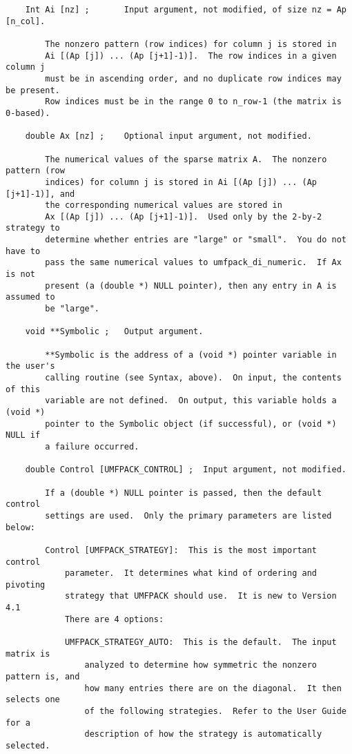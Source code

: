 \documentclass[11pt]{article}
\begin{document}
{\begin{verbatim}
    Int Ai [nz] ;       Input argument, not modified, of size nz = Ap [n_col].

        The nonzero pattern (row indices) for column j is stored in
        Ai [(Ap [j]) ... (Ap [j+1]-1)].  The row indices in a given column j
        must be in ascending order, and no duplicate row indices may be present.
        Row indices must be in the range 0 to n_row-1 (the matrix is 0-based).

    double Ax [nz] ;    Optional input argument, not modified.

        The numerical values of the sparse matrix A.  The nonzero pattern (row
        indices) for column j is stored in Ai [(Ap [j]) ... (Ap [j+1]-1)], and
        the corresponding numerical values are stored in
        Ax [(Ap [j]) ... (Ap [j+1]-1)].  Used only by the 2-by-2 strategy to
        determine whether entries are "large" or "small".  You do not have to
        pass the same numerical values to umfpack_di_numeric.  If Ax is not
        present (a (double *) NULL pointer), then any entry in A is assumed to
        be "large".

    void **Symbolic ;   Output argument.

        **Symbolic is the address of a (void *) pointer variable in the user's
        calling routine (see Syntax, above).  On input, the contents of this
        variable are not defined.  On output, this variable holds a (void *)
        pointer to the Symbolic object (if successful), or (void *) NULL if
        a failure occurred.

    double Control [UMFPACK_CONTROL] ;  Input argument, not modified.

        If a (double *) NULL pointer is passed, then the default control
        settings are used.  Only the primary parameters are listed below:

        Control [UMFPACK_STRATEGY]:  This is the most important control
            parameter.  It determines what kind of ordering and pivoting
            strategy that UMFPACK should use.  It is new to Version 4.1
            There are 4 options:

            UMFPACK_STRATEGY_AUTO:  This is the default.  The input matrix is
                analyzed to determine how symmetric the nonzero pattern is, and
                how many entries there are on the diagonal.  It then selects one
                of the following strategies.  Refer to the User Guide for a
                description of how the strategy is automatically selected.


\end{verbatim}}
\end{document}
